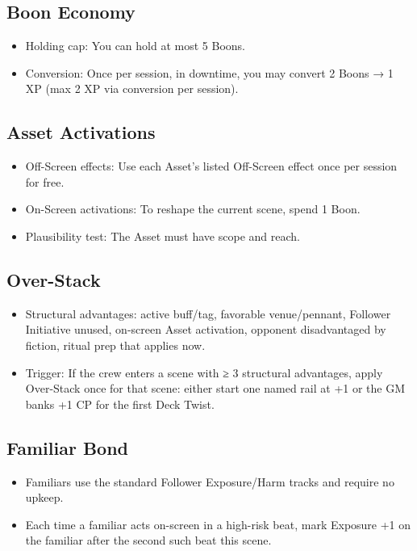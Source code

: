 \documentclass[11pt]{article}
\begin{document}
\subsection{Boon Economy}
\begin{itemize}
    \item Holding cap: You can hold at most 5 Boons.
    \item Conversion: Once per session, in downtime, you may convert 2 Boons → 1 XP (max 2 XP via conversion per session).
\end{itemize}

\subsection{Asset Activations}
\begin{itemize}
    \item Off-Screen effects: Use each Asset's listed Off-Screen effect once per session for free.
    \item On-Screen activations: To reshape the current scene, spend 1 Boon.
    \item Plausibility test: The Asset must have scope and reach.
\end{itemize}

\subsection{Over-Stack}
\begin{itemize}
    \item Structural advantages: active buff/tag, favorable venue/pennant, Follower Initiative unused, on-screen Asset activation, opponent disadvantaged by fiction, ritual prep that applies now.
    \item Trigger: If the crew enters a scene with ≥ 3 structural advantages, apply Over-Stack once for that scene: either start one named rail at +1 or the GM banks +1 CP for the first Deck Twist.
\end{itemize}

\subsection{Familiar Bond}
\begin{itemize}
    \item Familiars use the standard Follower Exposure/Harm tracks and require no upkeep.
    \item Each time a familiar acts on-screen in a high-risk beat, mark Exposure +1 on the familiar after the second such beat this scene.
\end{itemize}
\end{document}
